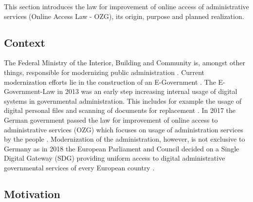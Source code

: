 \documentclass[
     12pt,         %
     a4paper,      %
     BCOR=10mm,version=first,     %
     DIV=14,version=first,        %
     ]{scrreprt}
\begin{document}
This section introduces the law for improvement of online access of administrative services (Online Access Law - OZG), its origin, purpose and planned realization.

\subsection{Context}

The Federal Ministry of the Interior, Building and Community is, amongst other things, responsible for modernizing public administration \cite{BMI:Moderne_Verwaltung}. Current modernization efforts lie in the construction of an E-Government \cite{BMI:Behoerdengaenge}.
The E-Government-Law in 2013 was an early step increasing internal usage of digital systems in governmental administration. This includes for example the usage of digital personal files and scanning of documents for replacement \cite{BMI:E-Government_Gesetz}. 
In 2017 the German government passed the law for improvement of online access to administrative services (OZG) which focuses on usage of administration services by the people \cite{BMI:Onlinezugangsgesetz}. 
Modernization of the administration, however, is not exclusive to Germany as in 2018 the European Parliament and Council decided on a Single Digital Gateway (SDG) providing uniform access to digital administrative governmental services of every European country \cite{BMI:Single_Digital_Gateway}.

\subsection{Motivation}
\end{document}
